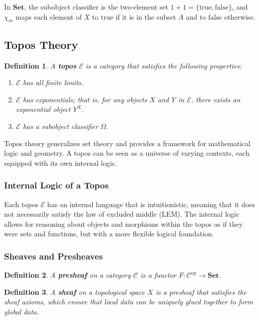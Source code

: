 \documentclass{article}
\newtheorem{definition}{Definition}[section]
\begin{document}
In $\mathbf{Set}$, the subobject classifier is the two-element set $1 + 1 = \{\text{true}, \text{false}\}$, and $\chi_m$ maps each element of $X$ to $\text{true}$ if it is in the subset $A$ and to $\text{false}$ otherwise.

\subsection{Topos Theory}

\begin{definition}
    A \textbf{topos} $\mathcal{E}$ is a category that satisfies the following properties:
    \begin{enumerate}
        \item $\mathcal{E}$ has all finite limits.
        \item $\mathcal{E}$ has exponentials; that is, for any objects $X$ and $Y$ in $\mathcal{E}$, there exists an exponential object $Y^X$.
        \item $\mathcal{E}$ has a subobject classifier $\Omega$.
    \end{enumerate}
\end{definition}

Topos theory generalizes set theory and provides a framework for mathematical logic and geometry. A topos can be seen as a universe of varying contexts, each equipped with its own internal logic.

\subsubsection{Internal Logic of a Topos}

Each topos $\mathcal{E}$ has an internal language that is intuitionistic, meaning that it does not necessarily satisfy the law of excluded middle (LEM). The internal logic allows for reasoning about objects and morphisms within the topos as if they were sets and functions, but with a more flexible logical foundation.

\subsubsection{Sheaves and Presheaves}

\begin{definition}
    A \textbf{presheaf} on a category $\mathcal{C}$ is a functor $F \colon \mathcal{C}^{\text{op}} \to \mathbf{Set}$.
\end{definition}

\begin{definition}
    A \textbf{sheaf} on a topological space $X$ is a presheaf that satisfies the sheaf axioms, which ensure that local data can be uniquely glued together to form global data.
\end{definition}
\end{document}
